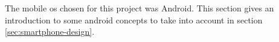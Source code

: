 The mobile \gls{os} chosen for this project was Android. This section gives an introduction to some android concepts to take into account in section \ref{sec:smartphone-design}. 
%


